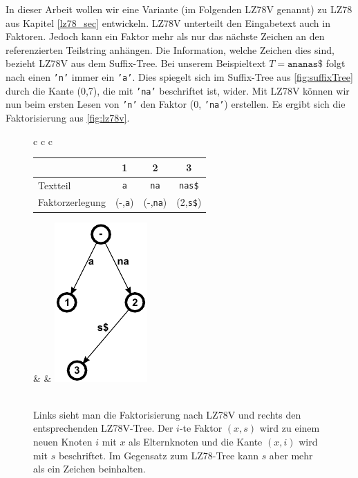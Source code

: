 \documentclass[a4paper,11pt]{scrartcl}%
\theoremstyle{change}
\theoremstyle{nonumberplain}
\theoremstyle{change}
\theoremstyle{nonumberplain}
\theoremstyle{change}
\theoremstyle{nonumberplain}
\begin{document}
In dieser Arbeit wollen wir eine Variante (im Folgenden LZ78V genannt) zu LZ78 aus Kapitel \ref{lz78_sec} entwickeln. LZ78V unterteilt den Eingabetext auch in Faktoren. Jedoch kann ein Faktor mehr als nur das nächste Zeichen an den referenzierten Teilstring anhängen. Die Information, welche Zeichen dies sind, bezieht LZ78V aus dem Suffix-Tree. Bei unserem Beispieltext $T = \texttt{ananas\$}$ folgt nach einen \texttt{'n'} immer ein \texttt{'a'}. Dies spiegelt sich im Suffix-Tree aus \autoref{fig:suffixTree} durch die Kante (0,7), die mit \texttt{'na'} beschriftet ist, wider. Mit LZ78V können wir nun beim ersten Lesen von \texttt{'n'} den Faktor (0, \texttt{'na'}) erstellen.
 Es ergibt sich die Faktorisierung aus \autoref{fig:lz78v}. \\
	\begin{figure}[h]
	\begin{tabular}[t]{c c c}
		\begin{tabular}[b]{l c c c}\hline
			& 1 & 2 & 3  \\ \hline
  		Textteil & \texttt{a} & \texttt{na} & \texttt{nas\$} \\ \hline
  		Faktorzerlegung & (-,\texttt{a}) & (-,\texttt{na}) & (2,\texttt{s\$}) \\ \hline
		\end{tabular} & \hspace{2cm} & \includegraphics{./pics/ananas_LZ78VTree}\\\\
	\end{tabular}
	\caption{Links sieht man die Faktorisierung nach LZ78V und rechts den entsprechenden LZ78V-Tree. Der $i$-te Faktor $(x,s)$ wird zu einem neuen Knoten $i$ mit $x$ als Elternknoten und die Kante $(x,i)$ wird mit $s$ beschriftet. Im Gegensatz zum LZ78-Tree kann $s$ aber mehr als ein Zeichen beinhalten.}
	\label{fig:lz78v}
	\end{figure}
	
\end{document}
